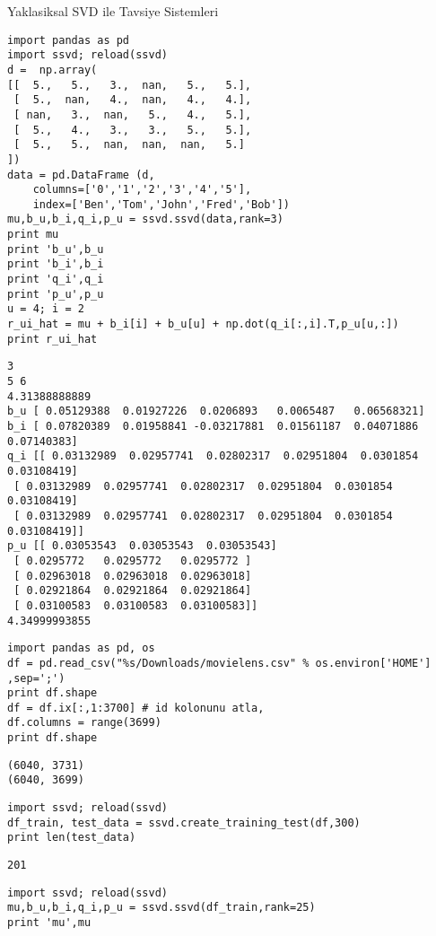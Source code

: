 \documentclass[12pt,fleqn]{article}\usepackage{../common}
\begin{document}
Yaklasiksal SVD ile Tavsiye Sistemleri

\begin{verbatim}
import pandas as pd
import ssvd; reload(ssvd)
d =  np.array(
[[  5.,   5.,   3.,  nan,   5.,   5.],
 [  5.,  nan,   4.,  nan,   4.,   4.],
 [ nan,   3.,  nan,   5.,   4.,   5.],
 [  5.,   4.,   3.,   3.,   5.,   5.],
 [  5.,   5.,  nan,  nan,  nan,   5.]
])
data = pd.DataFrame (d,
    columns=['0','1','2','3','4','5'],
    index=['Ben','Tom','John','Fred','Bob'])
mu,b_u,b_i,q_i,p_u = ssvd.ssvd(data,rank=3)
print mu
print 'b_u',b_u
print 'b_i',b_i
print 'q_i',q_i
print 'p_u',p_u
u = 4; i = 2
r_ui_hat = mu + b_i[i] + b_u[u] + np.dot(q_i[:,i].T,p_u[u,:])
print r_ui_hat
\end{verbatim}

\begin{verbatim}
3
5 6
4.31388888889
b_u [ 0.05129388  0.01927226  0.0206893   0.0065487   0.06568321]
b_i [ 0.07820389  0.01958841 -0.03217881  0.01561187  0.04071886  0.07140383]
q_i [[ 0.03132989  0.02957741  0.02802317  0.02951804  0.0301854   0.03108419]
 [ 0.03132989  0.02957741  0.02802317  0.02951804  0.0301854   0.03108419]
 [ 0.03132989  0.02957741  0.02802317  0.02951804  0.0301854   0.03108419]]
p_u [[ 0.03053543  0.03053543  0.03053543]
 [ 0.0295772   0.0295772   0.0295772 ]
 [ 0.02963018  0.02963018  0.02963018]
 [ 0.02921864  0.02921864  0.02921864]
 [ 0.03100583  0.03100583  0.03100583]]
4.34999993855
\end{verbatim}


\begin{verbatim}
import pandas as pd, os
df = pd.read_csv("%s/Downloads/movielens.csv" % os.environ['HOME'] ,sep=';')
print df.shape
df = df.ix[:,1:3700] # id kolonunu atla,
df.columns = range(3699)
print df.shape
\end{verbatim}

\begin{verbatim}
(6040, 3731)
(6040, 3699)
\end{verbatim}

\begin{verbatim}
import ssvd; reload(ssvd)
df_train, test_data = ssvd.create_training_test(df,300)
print len(test_data)
\end{verbatim}

\begin{verbatim}
201
\end{verbatim}


\begin{verbatim}
import ssvd; reload(ssvd)
mu,b_u,b_i,q_i,p_u = ssvd.ssvd(df_train,rank=25)
print 'mu',mu
\end{verbatim}
\end{document}
